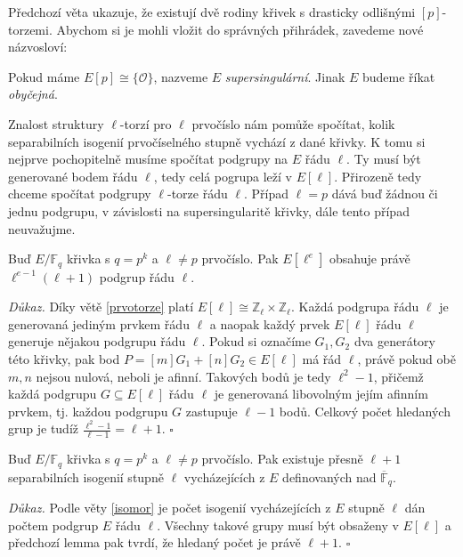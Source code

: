 \documentclass[12pt]{report}
\begin{document}
Předchozí věta ukazuje, že existují dvě rodiny křivek s drasticky odlišnými $[p]$-torzemi. Abychom si je mohli vložit do správných přihrádek, zavedeme nové názvosloví:

\begin{definice}
Pokud máme $E[p] \cong \lbrace \mathcal{O} \rbrace $, nazveme $E$ \textit{supersingulární}. Jinak $E$ budeme říkat \textit{obyčejná}.
\end{definice}

Znalost struktury $\ell$-torzí pro $\ell$ prvočíslo nám pomůže spočítat, kolik separabilních isogenií prvočíselného stupně vychází z dané křivky. K tomu si nejprve pochopitelně musíme spočítat podgrupy na $E$ řádu $\ell$. Ty musí být generované bodem řádu $\ell$, tedy celá pogrupa leží v $E[\ell]$. Přirozeně tedy chceme spočítat podgrupy $\ell$-torze řádu $\ell$. Případ $\ell = p$ dává buď žádnou či jednu podgrupu, v závislosti na supersingularitě křivky, dále tento případ neuvažujme.
\begin{lemma}\label{bigl+1}
Buď $E/\mathbb{F}_{q}$ křivka s $q = p^k$ a $\ell \neq p$ prvočíslo. Pak $E[\ell ^e]$ obsahuje právě $\ell^{e-1} (\ell+1)$ podgrup řádu $\ell$.
\end{lemma}
\noindent \textit{Důkaz.} Díky větě \ref{prvotorze} platí $E[\ell] \cong \mathbb{Z}_{\ell} \times \mathbb{Z}_{\ell}$. Každá podgrupa řádu $\ell$ je generovaná jediným prvkem řádu $\ell$ a naopak každý prvek $E[\ell]$ řádu $\ell$ generuje nějakou podgrupu řádu $\ell$. Pokud si označíme $G_1, G_2$ dva generátory této křivky, pak bod $P = [m] G_1 + [n] G_2 \in E[\ell]$ má řád $\ell$, právě pokud obě $m,n$ nejsou nulová, neboli je afinní. Takových bodů je tedy $\ell^2 - 1$, přičemž každá podgrupu $G \subseteq E[\ell]$ řádu $\ell$ je generovaná libovolným jejím afinním prvkem, tj. každou podgrupu $G$ zastupuje $\ell-1$ bodů. Celkový počet hledaných grup je tudíž $\frac{\ell^2 - 1}{\ell - 1} = \ell +1$. \hfill $\square$\\

\begin{dusledek}\label{l+1}
Buď $E/\mathbb{F}_{q}$ křivka s $q = p^k$ a $\ell \neq p$ prvočíslo. Pak existuje přesně $\ell+1$ separabilních isogenií stupně $\ell$ vycházejících z $E$ definovaných nad $\overline{\mathbb{F}}_{q}$.
\end{dusledek}
\noindent \textit{Důkaz.} Podle věty \ref{isomor} je počet isogenií vycházejících z $E$ stupně $\ell$ dán počtem podgrup $E$ řádu $\ell$. Všechny takové grupy musí být obsaženy v $E[\ell]$ a předchozí lemma pak tvrdí, že hledaný počet je právě $\ell+1$. \hfill $\square$\\
\end{document}
